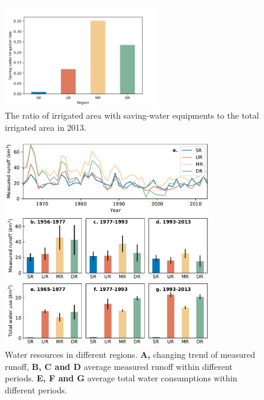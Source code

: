 \documentclass[9pt,twoside,lineno]{pnas-new}
\begin{document}
\begin{figure}
    \centering
    \includegraphics[width=0.6\textwidth]{../../figures/sup/saving_water.jpg}
    \caption{
        The ratio of irrigated area with saving-water equipments to the total irrigated area in 2013.
    }
\end{figure}


\begin{figure}
    \centering
    \includegraphics[width=0.8\textwidth]{../../figures/sup/sf_measured_runoff.pdf}
    \caption{Water resources in different regions.
        \textbf{A,} changing trend of measured runoff,
        \textbf{B, C and D} average measured runoff within different periods.
        \textbf{E, F and G} average total water consumptions within different periods.
    }
\end{figure}
\end{document}
